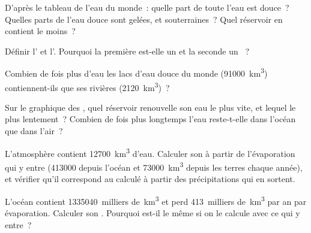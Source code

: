 \begin{exercise}[$\star$]\label{exo:g10:freshwater-resources:2}
D'après le tableau de l'eau du monde~: quelle part de toute l'eau est
douce~? Quelles parts de l'eau douce sont gelées, et souterraines~? Quel
réservoir en contient le moins~?
\end{exercise}

\begin{exercise}[$\star$]\label{exo:g10:freshwater-resources:3}
Définir l' et l'. Pourquoi la
première est-elle un  et la seconde un ~?
\end{exercise}

\begin{exercise}[$\star$]\label{exo:g10:freshwater-resources:4}
Combien de fois plus d'eau les lacs d'eau douce du monde
(\num{91000}~\unit{km^3}) contiennent-ils que ses rivières
(\num{2120}~\unit{km^3})~?
\end{exercise}

\begin{exercise}[$\star$]\label{exo:g10:freshwater-resources:5}
Sur le graphique des , quel réservoir renouvelle son eau
le plus vite, et lequel le plus lentement~? Combien de fois plus longtemps
l'eau reste-t-elle dans l'océan que dans l'air~?
\end{exercise}

\begin{exercise}[$\star\star$]\label{exo:g10:freshwater-resources:6}
L'atmosphère contient \num{12700}~\unit{km^3} d'eau. Calculer son  à partir de l'évaporation qui y entre (\num{413000} depuis
l'océan et \num{73000}~\unit{km^3} depuis les terres chaque année), et
vérifier qu'il correspond au  calculé à partir des
précipitations qui en sortent.
\end{exercise}

\begin{exercise}[$\star\star$]\label{exo:g10:freshwater-resources:7}
L'océan contient \num{1335040}~milliers de~\unit{km^3} et perd
\num{413}~milliers de~\unit{km^3} par an par évaporation. Calculer son
. Pourquoi est-il le même si on le calcule avec ce qui y
entre~?
\end{exercise}


